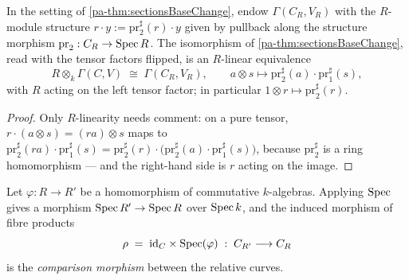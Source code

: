 \begin{definition}
  \label{pa-def:relSectionsBaseChange}
  \leanok

  In the setting of \ref{pa-thm:sectionsBaseChange}, endow \(\Gamma(C_R, V_R)\) with the
  \(R\)-module structure \(r \cdot y := \mathrm{pr}_2^{\sharp}(r) \cdot y\) given by
  pullback along the structure morphism \(\mathrm{pr}_2 : C_R \to \operatorname{Spec} R\). The
  isomorphism of \ref{pa-thm:sectionsBaseChange}, read with the tensor factors flipped, is
  an \(R\)-linear equivalence
  \[
    R \otimes_k \Gamma(C, V) \;\cong\; \Gamma(C_R, V_R), \qquad
    a \otimes s \longmapsto \mathrm{pr}_2^{\sharp}(a) \cdot \mathrm{pr}_1^{\sharp}(s),
  \]
  with \(R\) acting on the left tensor factor; in particular
  \(1 \otimes r \mapsto \mathrm{pr}_2^{\sharp}(r)\).
\end{definition}
\begin{proof}
  \leanok
  Only \(R\)-linearity needs comment: on a pure tensor,
  \(r \cdot (a \otimes s) = (ra) \otimes s\) maps to
  \(\mathrm{pr}_2^{\sharp}(ra) \cdot \mathrm{pr}_1^{\sharp}(s) =
  \mathrm{pr}_2^{\sharp}(r) \cdot \bigl(\mathrm{pr}_2^{\sharp}(a) \cdot
  \mathrm{pr}_1^{\sharp}(s)\bigr)\), because \(\mathrm{pr}_2^{\sharp}\) is a ring
  homomorphism --- and the right-hand side is \(r\) acting on the image.
\end{proof}

\begin{definition}
  \label{pa-def:relCurveMap}
  \leanok

  Let \(\varphi : R \to R'\) be a homomorphism of commutative \(k\)-algebras. Applying
  \(\operatorname{Spec}\) gives a morphism \(\operatorname{Spec} R' \to \operatorname{Spec} R\) over \(\operatorname{Spec} k\), and the induced
  morphism of fibre products
  \[
    \rho \;=\; \mathrm{id}_C \times \operatorname{Spec}(\varphi) \;:\; C_{R'} \longrightarrow C_R
  \]
  is the \emph{comparison morphism} between the relative curves.
\end{definition}

